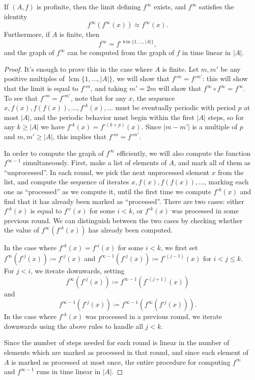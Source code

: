 \documentclass[letterpaper,11pt]{article}
\DeclareMathOperator{\lcm}{lcm}
\begin{document}
\begin{prop} If $(A,f)$ is profinite, then the limit defining $f^{\infty}$ exists, and $f^{\infty}$ satisfies the identity
\[
f^{\infty}(f^{\infty}(x)) \approx f^{\infty}(x).
\]
Furthermore, if $A$ is finite, then
\[
f^{\infty} = f^{\circ \lcm\{1, ..., |A|\}},
\]
and the graph of $f^{\infty}$ can be computed from the graph of $f$ in time linear in $|A|$.
\end{prop}
\begin{proof} It's enough to prove this in the case where $A$ is finite. Let $m, m'$ be any positive multiples of $\lcm\{1, ..., |A|\}$, we will show that $f^{\circ m} = f^{\circ m'}$: this will show that the limit is equal to $f^{\circ m}$, and taking $m' = 2m$ will show that $f^\infty \circ f^\infty = f^\infty$. To see that $f^{\circ m} = f^{\circ m'}$, note that for any $x$, the sequence $x, f(x), f(f(x)), ..., f^{\circ k}(x), ...$ must be eventually periodic with period $p$ at most $|A|$, and the periodic behavior must begin within the first $|A|$ steps, so for any $k \ge |A|$ we have $f^{\circ k}(x) = f^{\circ (k+p)}(x)$. Since $|m-m'|$ is a multiple of $p$ and $m,m' \ge |A|$, this implies that $f^{\circ m} = f^{\circ m'}$.

In order to compute the graph of $f^{\infty}$ efficiently, we will also compute the function $f^{\infty - 1}$ simultaneously. First, make a list of elements of $A$, and mark all of them as ``unprocessed''. In each round, we pick the next unprocessed element $x$ from the list, and compute the sequence of iterates $x, f(x), f(f(x)), ...$, marking each one as ``processed'' as we compute it, until the first time we compute $f^{\circ k}(x)$ and find that it has already been marked as ``processed''. There are two cases: either $f^{\circ k}(x)$ is equal to $f^{\circ i}(x)$ for some $i < k$, or $f^{\circ k}(x)$ was processed in some previous round. We can distinguish between the two cases by checking whether the value of $f^\infty(f^{\circ k}(x))$ has already been computed.

In the case where $f^{\circ k}(x) = f^{\circ i}(x)$ for some $i < k$, we first set $f^\infty(f^{\circ j}(x)) \coloneqq f^{\circ j}(x)$ and $f^{\infty-1}(f^{\circ j}(x)) \coloneqq f^{\circ (j-1)}(x)$ for $i < j \le k$. For $j < i$, we iterate downwards, setting
\[
f^\infty(f^{\circ j}(x)) \coloneqq f^{\infty - 1}(f^{\circ (j+1)}(x))
\]
and
\[
f^{\infty-1}(f^{\circ j}(x)) \coloneqq f^{\infty - 1}(f^\infty(f^{\circ j}(x))).
\]
In the case where $f^{\circ k}(x)$ was processed in a previous round, we iterate downwards using the above rules to handle all $j < k$.

Since the number of steps needed for each round is linear in the number of elements which are marked as processed in that round, and since each element of $A$ is marked as processed at most once, the entire procedure for computing $f^\infty$ and $f^{\infty-1}$ runs in time linear in $|A|$.
\end{proof}
\end{document}

